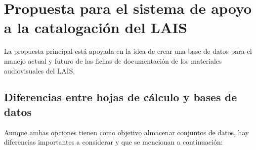 \documentclass[10pt,letterpaper]{article}
\begin{document}
\section{Propuesta para el sistema de apoyo a la catalogación del LAIS}
La propuesta principal está apoyada en la idea de crear una base de datos para el manejo actual y futuro de las fichas de documentación de los materiales audiovisuales del LAIS.

\subsection{Diferencias entre hojas de cálculo y bases de datos}
Aunque ambas opciones tienen como objetivo almacenar conjuntos de datos, hay diferencias importantes a considerar y que se mencionan a continuación:

\end{document}
